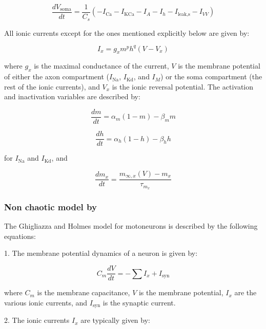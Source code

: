 \begin{equation}
	\frac{dV_{\text{soma}}}{dt} = \frac{1}{C_s} \left( -I_{\text{Ca}} - I_{\text{KCa}} - I_A - I_h - I_{\text{leak,s}} - I_{VV} \right)
\end{equation}

All ionic currents except for the ones mentioned explicitly below are given by:

\begin{equation}
	I_x = g_x m^p h^q (V - V_x)
\end{equation}

where $g_x$ is the maximal conductance of the current, $V$ is the membrane potential of either the axon compartment ($I_{\text{Na}}$, $I_{\text{Kd}}$, and $I_M$) or the soma compartment (the rest of the ionic currents), and $V_x$ is the ionic reversal potential. The activation and inactivation variables are described by:

\begin{equation}
	\frac{dm}{dt} = \alpha_m (1 - m) - \beta_m m
\end{equation}

\begin{equation}
	\frac{dh}{dt} = \alpha_h (1 - h) - \beta_h h
\end{equation}

for $I_{\text{Na}}$ and $I_{\text{Kd}}$, and

\begin{equation}
	\frac{dm_x}{dt} = \frac{m_{\infty,x}(V) - m_x}{\tau_{m_x}}
\end{equation}

\subsubsection{Non chaotic model by \textcite{ghigliazza_minimal_2004}}
The Ghigliazza and Holmes model \parencite{ghigliazza_minimal_2004} for motoneurons is described by the following equations:

1. The membrane potential dynamics of a neuron is given by:

\begin{equation}
	C_m \frac{dV}{dt} = -\sum I_x + I_{\text{syn}}
\end{equation}

where \( C_m \) is the membrane capacitance, \( V \) is the membrane potential, \( I_x \) are the various ionic currents, and \( I_{\text{syn}} \) is the synaptic current.

2. The ionic currents \( I_x \) are typically given by:

